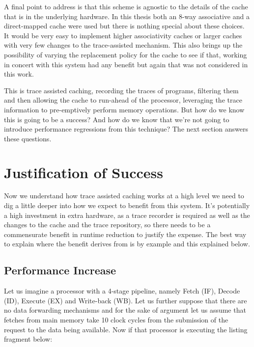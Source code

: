 
A final point to address is that this scheme is agnostic to the details of the cache that is in the underlying hardware. In this thesis both an 8-way associative and a direct-mapped cache were used but there is nothing special about these choices. It would be very easy to implement higher associativity caches or larger caches with very few changes to the trace-assisted mechanism. This also brings up the possibility of varying the replacement policy for the cache to see if that, working in concert with this system had any benefit but again that was not considered in this work. 

This is trace assisted caching, recording the traces of programs, filtering them and then allowing the cache to run-ahead of the processor, leveraging the trace information to pre-emptively perform memory operations. But how do we know this is going to be a success? And how do we know that we're not going to introduce performance regressions from this technique? The next section answers these questions.

\section{Justification of Success}

Now we understand how trace assisted caching works at a high level we need to dig a little deeper into how we expect to benefit from this system. It's potentially a high investment in extra hardware, as a trace recorder is required as well as the changes to the cache and the trace repository, so there needs to be a commensurate benefit in runtime reduction to justify the expense. The best way to explain where the benefit derives from is by example and this explained below.

\subsection{Performance Increase}

Let us imagine a processor with a 4-stage pipeline, namely Fetch (IF), Decode (ID), Execute (EX) and Write-back (WB). Let us further suppose that there are no data forwarding mechanisms and for the sake of argument let us assume that fetches from main memory take 10 clock cycles from the submission of the request to the data being available. Now if that processor is executing the listing fragment below:



